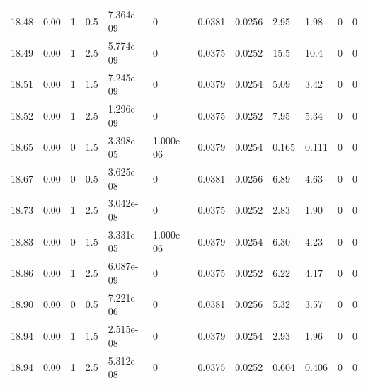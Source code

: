 \documentclass[preview]{standalone}
\begin{document}
{{{{{{\begin{tabular}{L{1.2cm}C{1.2cm} C{0.3cm}C{0.5cm} C{1.4cm}C{1.4cm} C{1.4cm}C{1.4cm} C{1.6cm}C{1.6cm} C{1.6cm}C{1.6cm}}
  18.48  &  0.00  & 1     & 0.5 &  7.364e-09  & 0  &  0.0381&   0.0256& 2.95 & 1.98   &  0 & 0  \\ 
  18.49  &  0.00  & 1     & 2.5 &  5.774e-09  & 0  &  0.0375&   0.0252& 15.5 & 10.4   &  0 & 0  \\ 
  18.51  &  0.00  & 1     & 1.5 &  7.245e-09  & 0  &  0.0379&   0.0254& 5.09 & 3.42   &  0 & 0  \\ 
  18.52  &  0.00  & 1     & 2.5 &  1.296e-09  & 0  &  0.0375&   0.0252& 7.95 & 5.34   &  0 & 0  \\ 
  18.65  &  0.00  & 0     & 1.5 &  3.398e-05  & 1.000e-06  &  0.0379&   0.0254& 0.165 & 0.111   &  0 & 0  \\ 
  18.67  &  0.00  & 0     & 0.5 &  3.625e-08  & 0  &  0.0381&   0.0256& 6.89 & 4.63   &  0 & 0  \\ 
  18.73  &  0.00  & 1     & 2.5 &  3.042e-08  & 0  &  0.0375&   0.0252& 2.83 & 1.90   &  0 & 0  \\ 
  18.83  &  0.00  & 0     & 1.5 &  3.331e-05  & 1.000e-06  &  0.0379&   0.0254& 6.30 & 4.23   &  0 & 0  \\ 
  18.86  &  0.00  & 1     & 2.5 &  6.087e-09  & 0  &  0.0375&   0.0252& 6.22 & 4.17   &  0 & 0  \\ 
  18.90  &  0.00  & 0     & 0.5 &  7.221e-06  & 0  &  0.0381&   0.0256& 5.32 & 3.57   &  0 & 0  \\ 
  18.94  &  0.00  & 1     & 1.5 &  2.515e-08  & 0  &  0.0379&   0.0254& 2.93 & 1.96   &  0 & 0  \\ 
  18.94  &  0.00  & 1     & 2.5 &  5.312e-08  & 0  &  0.0375&   0.0252& 0.604 & 0.406   &  0 & 0  \\ 
\hline 
\end{tabular} 

}}}}}}
\end{document}
